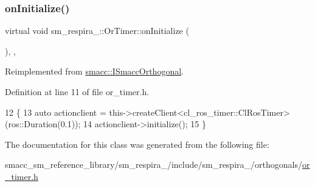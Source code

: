 \subsubsection{\texorpdfstring{on\+Initialize()}{onInitialize()}}
{\footnotesize\ttfamily virtual void sm\+\_\+respira\+\_\+::\+Or\+Timer\+::on\+Initialize (\begin{DoxyParamCaption}{ }\end{DoxyParamCaption})\hspace{0.3cm}{\ttfamily [inline]}, {\ttfamily [override]}, {\ttfamily [virtual]}}



Reimplemented from \hyperlink{classsmacc_1_1ISmaccOrthogonal_a6bb31c620cb64dd7b8417f8705c79c7a}{smacc\+::\+I\+Smacc\+Orthogonal}.



Definition at line 11 of file or\+\_\+timer.\+h.


\begin{DoxyCode}
12     \{
13         \textcolor{keyword}{auto} actionclient = this->createClient<cl\_ros\_timer::ClRosTimer>(ros::Duration(0.1));
14         actionclient->initialize();
15     \}
\end{DoxyCode}


The documentation for this class was generated from the following file\+:\begin{DoxyCompactItemize}
\item 
smacc\+\_\+sm\+\_\+reference\+\_\+library/sm\+\_\+respira\+\_/include/sm\+\_\+respira\+\_/orthogonals/\hyperlink{sm__respira__1_2include_2sm__respira__1_2orthogonals_2or__timer_8h}{or\+\_\+timer.\+h}\end{DoxyCompactItemize}
